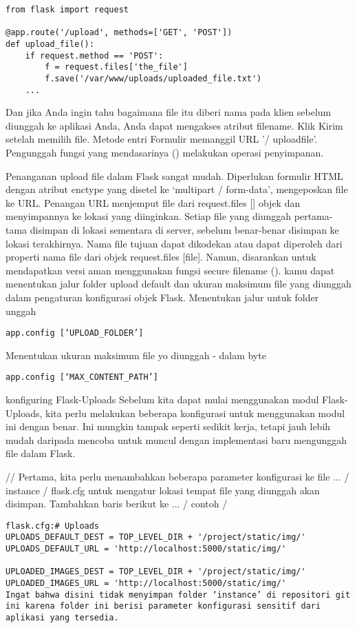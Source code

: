 \documentclass[12pt,a4paper]{article}
\begin{document}
\begin{verbatim}
from flask import request

@app.route('/upload', methods=['GET', 'POST'])
def upload_file():
    if request.method == 'POST':
        f = request.files['the_file']
        f.save('/var/www/uploads/uploaded_file.txt')
    ...
\end{verbatim}
Dan jika Anda ingin tahu bagaimana file itu diberi nama pada klien sebelum diunggah ke aplikasi Anda, Anda dapat mengakses atribut filename.
Klik Kirim setelah memilih file. Metode entri Formulir memanggil URL '/ uploadfile'. Pengunggah fungsi yang mendasarinya () melakukan operasi penyimpanan.

Penanganan upload file dalam Flask sangat mudah. Diperlukan formulir HTML dengan atribut enctype yang disetel ke ‘multipart / form-data’, mengeposkan file ke URL. Penangan URL menjemput file dari request.files [] objek dan menyimpannya ke lokasi yang diinginkan.
	Setiap file yang diunggah pertama-tama disimpan di lokasi sementara di server, sebelum benar-benar disimpan ke lokasi terakhirnya. Nama file tujuan dapat dikodekan atau dapat diperoleh dari properti nama file dari objek request.files [file]. Namun, disarankan untuk mendapatkan versi aman menggunakan fungsi secure filename ().
kamu dapat menentukan jalur folder upload default dan ukuran maksimum file yang diunggah dalam pengaturan konfigurasi objek Flask.
Menentukan jalur untuk folder unggah
\begin{verbatim}
app.config [‘UPLOAD_FOLDER’] 
\end{verbatim}
Menentukan ukuran maksimum file yo diunggah - dalam byte
\begin{verbatim}
app.config [‘MAX_CONTENT_PATH’] 
\end{verbatim}



konfiguring Flask-Uploads
Sebelum kita dapat mulai menggunakan modul Flask-Uploads, kita perlu melakukan beberapa konfigurasi untuk menggunakan modul ini dengan benar. Ini mungkin tampak seperti sedikit kerja, tetapi jauh lebih mudah daripada mencoba untuk muncul dengan implementasi baru mengunggah file dalam Flask.

// Pertama, kita perlu menambahkan beberapa parameter konfigurasi ke file ... / instance / flask.cfg untuk mengatur lokasi tempat file yang diunggah akan disimpan. Tambahkan baris berikut ke ... / contoh / 

\begin{verbatim}
flask.cfg:# Uploads
UPLOADS_DEFAULT_DEST = TOP_LEVEL_DIR + '/project/static/img/'
UPLOADS_DEFAULT_URL = 'http://localhost:5000/static/img/'
 
UPLOADED_IMAGES_DEST = TOP_LEVEL_DIR + '/project/static/img/'
UPLOADED_IMAGES_URL = 'http://localhost:5000/static/img/'
Ingat bahwa disini tidak menyimpan folder ‘instance’ di repositori git ini karena folder ini berisi parameter konfigurasi sensitif dari aplikasi yang tersedia.

\end{verbatim}
\end{document}

